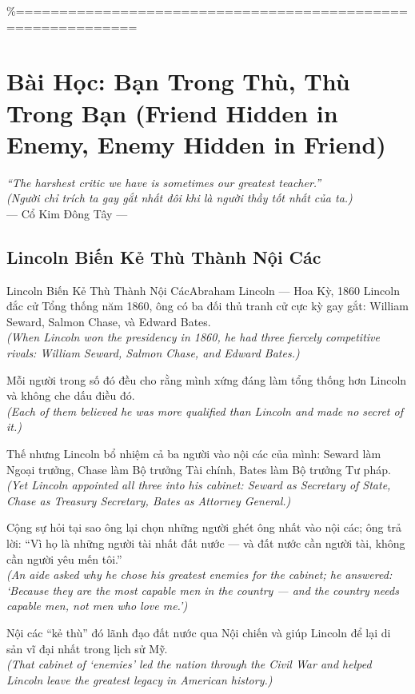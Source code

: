 \%============================================================
\chapter{Bài Học: Bạn Trong Thù, Thù Trong Bạn (Friend Hidden in Enemy, Enemy Hidden in Friend)}
\begin{center}
  \textit{\color{truyengold}``The harshest critic we have is sometimes our greatest teacher.''}\\[4pt]
  \textit{(Người chỉ trích ta gay gắt nhất đôi khi là người thầy tốt nhất của ta.)}\\[4pt]
  \small\color{truyenblue}--- Cổ Kim Đông Tây ---
\end{center}
\ngancach

\section{Lincoln Biến Kẻ Thù Thành Nội Các}
\begin{truyen}{Lincoln Biến Kẻ Thù Thành Nội Các}{Abraham Lincoln --- Hoa Kỳ, 1860}
 Lincoln đắc cử Tổng thống năm 1860, ông có ba đối thủ tranh cử cực kỳ gay gắt: William Seward, Salmon Chase, và Edward Bates.\\[4pt]
\textit{(When Lincoln won the presidency in 1860, he had three fiercely competitive rivals: William Seward, Salmon Chase, and Edward Bates.)}

Mỗi người trong số đó đều cho rằng mình xứng đáng làm tổng thống hơn Lincoln và không che dấu điều đó.\\[4pt]
\textit{(Each of them believed he was more qualified than Lincoln and made no secret of it.)}

Thế nhưng Lincoln bổ nhiệm cả ba người vào nội các của mình: Seward làm Ngoại trưởng, Chase làm Bộ trưởng Tài chính, Bates làm Bộ trưởng Tư pháp.\\[4pt]
\textit{(Yet Lincoln appointed all three into his cabinet: Seward as Secretary of State, Chase as Treasury Secretary, Bates as Attorney General.)}

Cộng sự hỏi tại sao ông lại chọn những người ghét ông nhất vào nội các; ông trả lời: ``Vì họ là những người tài nhất đất nước --- và đất nước cần người tài, không cần người yêu mến tôi.''\\[4pt]
\textit{(An aide asked why he chose his greatest enemies for the cabinet; he answered: `Because they are the most capable men in the country --- and the country needs capable men, not men who love me.')}

Nội các ``kẻ thù'' đó lãnh đạo đất nước qua Nội chiến và giúp Lincoln để lại di sản vĩ đại nhất trong lịch sử Mỹ.\\[4pt]
\textit{(That cabinet of `enemies' led the nation through the Civil War and helped Lincoln leave the greatest legacy in American history.)}

\end{truyen}
